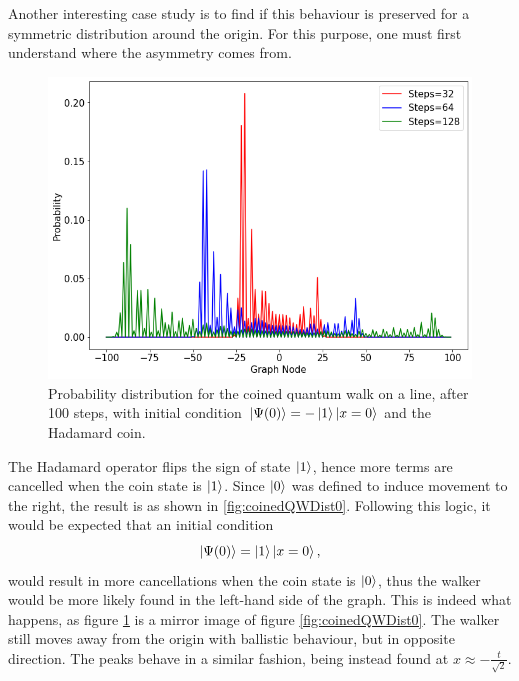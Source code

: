 \documentclass[../../dissertation.tex]{subfiles}
\begin{document}
Another interesting case study is to find if this behaviour is preserved for a
symmetric distribution around the origin. For this purpose, one must first
understand where the asymmetry comes from.
\begin{figure}[!h]
	\centering
	\includegraphics[scale=0.40]{img/CoinedQuantumWalk/CoinedMultiple_psi1_3264128.png}
	\caption{Probability distribution for the coined quantum walk on a line, after 100 steps, with initial condition $\ket{\Psi(0)}=-\ket{1}\ket{x=0}$ and the Hadamard coin.} 
	\label{fig:coinedQWDist1}
\end{figure}
The Hadamard operator flips the sign of state $\ket{1}$, hence more terms are
cancelled when the coin state is $\ket{1}$. Since $\ket{0}$ was defined to
induce movement to the right, the result is as shown in
\ref{fig:coinedQWDist0}. Following this logic, it would be expected that an
initial condition 
\begin{equation}
	\ket{\Psi(0)} = \ket{1}\ket{x=0},
	\label{eq:coinedQWInitCond1}
\end{equation}
would result in more cancellations when the coin state is $\ket{0}$, thus the
walker would be more likely found in the left-hand side of the graph. This is
indeed what happens, as figure \ref{fig:coinedQWDist1} is a mirror image of
figure \ref{fig:coinedQWDist0}. The walker still moves away from the origin
with ballistic behaviour, but in opposite direction. The peaks behave in a
similar fashion, being instead found at $x \approx -\frac{t}{\sqrt{2}}$.\par
\end{document}

